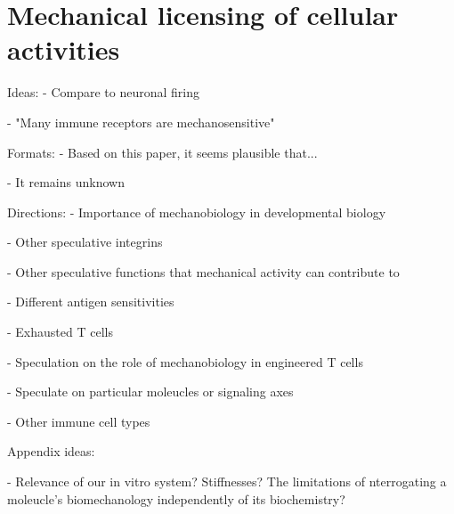 \section{Mechanical licensing of cellular activities}

Ideas:
- Compare to neuronal firing

- "Many immune receptors are mechanosensitive"

Formats:
- Based on this paper, it seems plausible that...

- It remains unknown 


Directions:
- Importance of mechanobiology in developmental biology

- Other speculative integrins

- Other speculative functions that mechanical activity can contribute to

- Different antigen sensitivities

- Exhausted T cells

- Speculation on the role of mechanobiology in engineered T cells

- Speculate on particular moleucles or signaling axes

- Other immune cell types

Appendix ideas:

- Relevance of our in vitro system? Stiffnesses? The limitations of nterrogating a moleucle's biomechanology independently of its biochemistry?
